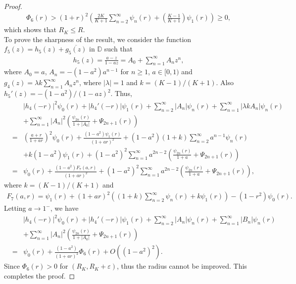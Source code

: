 \documentclass[11pt,reqno]{amsart}
\newtheorem{open problem}{Open problem}[section]
\newcommand{\ol}{\overline}
\newcommand{\beas}{\begin{eqnarray*}}
\newcommand{\eeas}{\end{eqnarray*}}
\renewcommand{\epsilon}{\varepsilon}
\numberwithin{equation}{section}
\begin{document}
\begin{proof}
\beas \Phi_6(r)>(1+r)^2\left(\frac{2K}{K+1}\sum_{n=2}^\infty \psi_n(r)+\left(\frac{K-1}{K+1}\right)\psi_1(r)\right)\geq 0,\eeas
which shows that $R_K\leq R$.\\[2mm]
\indent To prove the sharpness of the result, we consider the function $f_5(z)=h_5(z)+\ol{g_5(z)}$ in $\mathbb{D}$ such that 
\beas h_5(z)=\frac{a-z}{1-az}=A_0+\sum_{n=1}^\infty A_n z^n,\eeas
where $A_0=a$, $A_n=-(1-a^2)a^{n-1}$ for $n\geq 1$, $a\in[0,1)$ and $g_4(z)=\lambda k \sum_{n=1}^\infty A_n z^n$, where $|\lambda|=1$ and $k=(K-1)/(K+1)$.
Also $h_5'(z)=-\left(1-a^2\right)/(1-az)^2$.
Thus, 
\beas &&|h_4(-r)|^2\psi_0(r)+|h_4'(-r)|\psi_1(r)+\sum_{n=2}^\infty |A_n| \psi_n(r)+\sum_{n=1}^\infty |\lambda k A_n| \psi_n(r)\\[2mm]
&&+\sum_{n=1}^\infty |A_n|^2\left(\frac{\psi_{2n}(r)}{1+|A_0|}+\Psi_{2n+1}(r)\right)\\[2mm]
&=&\left(\frac{a+r}{1+ar}\right)^2\psi_0(r)+\frac{\left(1-a^2\right)\psi_1(r)}{(1+ar)^2}+\left(1-a^2\right)(1+k)\sum_{n=2}^\infty a^{n-1} \psi_n(r)\\[2mm]
&&+k\left(1-a^2\right)\psi_1(r)+\left(1-a^2\right)^2\sum_{n=1}^\infty a^{2n-2}\left(\frac{\psi_{2n}(r)}{1+a}+\Psi_{2n+1}(r)\right)\\[2mm]
&=&\psi_0(r)+\frac{\left(1-a^2\right)F_7(a,r)}{(1+ar)^2}+\left(1-a^2\right)^2\sum_{n=1}^\infty a^{2n-2}\left(\frac{\psi_{2n}(r)}{1+a}+\Psi_{2n+1}(r)\right),\eeas
where $k=(K-1)/(K+1)$ and 
\beas F_7(a,r)=\psi_1(r)+(1+ar)^2\left((1+k)\sum_{n=2}^\infty \psi_n(r)+k\psi_1(r)\right)-\left(1-r^2\right)\psi_0(r).\eeas
Letting $a\to 1^-$, we have
\beas&&|h_4(-r)|^2\psi_0(r)+|h_4'(-r)|\psi_1(r)+\sum_{n=2}^\infty |A_n| \psi_n(r)+\sum_{n=1}^\infty |B_n| \psi_n(r)\\[2mm]
&&+\sum_{n=1}^\infty |A_n|^2\left(\frac{\psi_{2n}(r)}{1+|A_0|}+\Psi_{2n+1}(r)\right)\hspace{10cm}\\[2mm]
&=&\psi_0(r)+\frac{\left(1-a^2\right)}{(1+ar)^2}\Phi_6(r)+O\left(\left(1-a^2\right)^2\right).\eeas 
Since $\Phi_6(r)>0$ for $(R_{K}, R_{K}+\epsilon)$, thus the radius cannot be improved. This completes the proof.
\end{proof}
\end{document}
